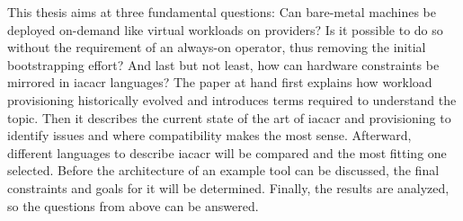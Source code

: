 \newline
This thesis aims at three fundamental questions: Can bare-metal machines be deployed on-demand like virtual workloads on providers? Is it possible to do so without the requirement of an always-on operator, thus removing the initial bootstrapping effort? And last but not least, how can hardware constraints be mirrored in \gls{iacacr} languages?
\newline
The paper at hand first explains how workload provisioning historically evolved and introduces terms required to understand the topic. Then it describes the current state of the art of \gls{iacacr} and provisioning to identify issues and where compatibility makes the most sense. Afterward, different languages to describe \gls{iacacr} will be compared and the most fitting one selected.
Before the architecture of an example tool can be discussed, the final constraints and goals for it will be determined. Finally, the results are analyzed, so the questions from above can be answered.
